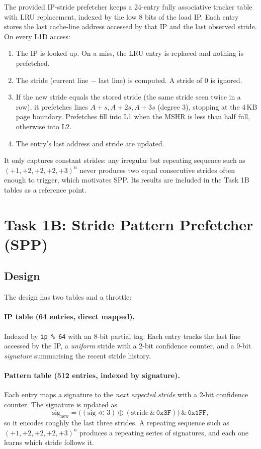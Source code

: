 \documentclass[11pt]{article}
\begin{document}
The provided IP-stride prefetcher keeps a 24-entry fully associative tracker table
with LRU replacement, indexed by the low 8 bits of the load IP. Each entry stores the
last cache-line address accessed by that IP and the last observed stride.
On every L1D access:
\begin{enumerate}
  \item The IP is looked up. On a miss, the LRU entry is replaced and nothing is prefetched.
  \item The stride (current line $-$ last line) is computed. A stride of 0 is ignored.
  \item If the new stride equals the stored stride (the same stride seen twice in a row),
        it prefetches lines $A+s, A+2s, A+3s$ (degree 3), stopping at the 4\,KB page boundary.
        Prefetches fill into L1 when the MSHR is less than half full, otherwise into L2.
  \item The entry's last address and stride are updated.
\end{enumerate}
It only captures constant strides: any irregular but repeating sequence such as
$(+1,+2,+2,+2,+3)^n$ never produces two equal consecutive strides often enough to
trigger, which motivates SPP. Its results are included in the Task 1B tables as a reference point.

\section{Task 1B: Stride Pattern Prefetcher (SPP)}

\subsection{Design}

The design has two tables and a throttle:

\paragraph{IP table (64 entries, direct mapped).}
Indexed by \texttt{ip \% 64} with an 8-bit partial tag. Each entry tracks the last
line accessed by the IP, a \emph{uniform} stride with a 2-bit confidence counter, and a
9-bit \emph{signature} summarising the recent stride history.

\paragraph{Pattern table (512 entries, indexed by signature).}
Each entry maps a signature to the \emph{next expected stride} with a 2-bit confidence counter.
The signature is updated as
\[
\text{sig}_{\text{new}} = \big((\text{sig} \ll 3) \oplus (\text{stride} \,\&\, \texttt{0x3F})\big) \,\&\, \texttt{0x1FF},
\]
so it encodes roughly the last three strides. A repeating sequence such as
$(+1,+2,+2,+2,+3)^n$ produces a repeating series of signatures, and each one learns
which stride follows it.
\end{document}
